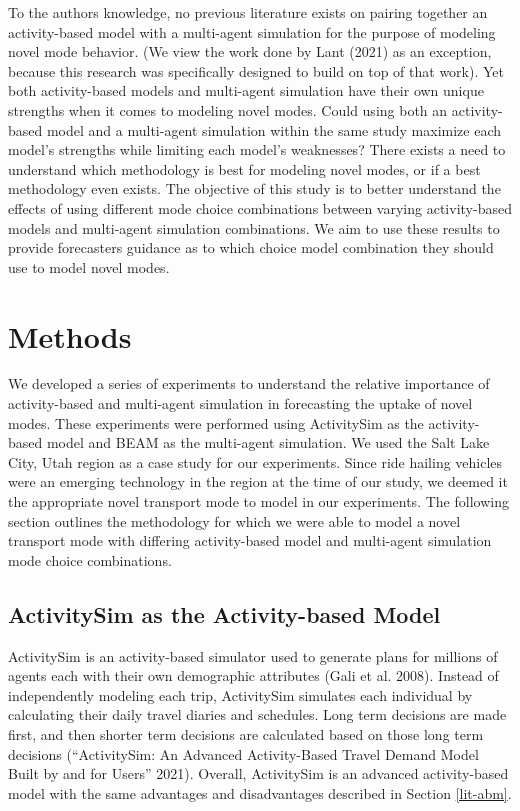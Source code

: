 \documentclass[12pt, oneside, openright]{byuthesis}
\begin{document}
To the authors knowledge, no previous literature exists on pairing together an activity-based model with a multi-agent simulation for the purpose of modeling novel mode behavior. (We view the work done by Lant (2021) as an exception, because this research was specifically designed to build on top of that work). Yet both activity-based models and multi-agent simulation have their own unique strengths when it comes to modeling novel modes. Could using both an activity-based model and a multi-agent simulation within the same study maximize each model's strengths while limiting each model's weaknesses? There exists a need to understand which methodology is best for modeling novel modes, or if a best methodology even exists. The objective of this study is to better understand the effects of using different mode choice combinations between varying activity-based models and multi-agent simulation combinations. We aim to use these results to provide forecasters guidance as to which choice model combination they should use to model novel modes.

\hypertarget{methods}{%
\chapter{Methods}\label{methods}}

We developed a series of experiments to understand the relative importance of activity-based and multi-agent simulation in forecasting the uptake of novel modes. These experiments were performed using ActivitySim as the activity-based model and BEAM as the multi-agent simulation. We used the Salt Lake City, Utah region as a case study for our experiments. Since ride hailing vehicles were an emerging technology in the region at the time of our study, we deemed it the appropriate novel transport mode to model in our experiments. The following section outlines the methodology for which we were able to model a novel transport mode with differing activity-based model and multi-agent simulation mode choice combinations.

\hypertarget{meth-asim}{%
\section{ActivitySim as the Activity-based Model}\label{meth-asim}}

ActivitySim is an activity-based simulator used to generate plans for millions of agents each with their own demographic attributes (Gali et al. 2008). Instead of independently modeling each trip, ActivitySim simulates each individual by calculating their daily travel diaries and schedules. Long term decisions are made first, and then shorter term decisions are calculated based on those long term decisions ({``ActivitySim: An Advanced Activity-Based Travel Demand Model Built by and for Users''} 2021). Overall, ActivitySim is an advanced activity-based model with the same advantages and disadvantages described in Section \ref{lit-abm}.
\end{document}
